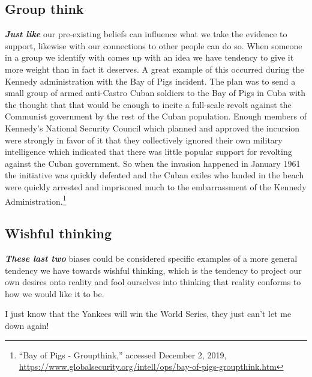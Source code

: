\documentclass[
  12pt, openany]{book}
\theoremstyle{definition}
\theoremstyle{definition}
\theoremstyle{definition}
\theoremstyle{remark}
\begin{document}
\hypertarget{group-think}{%
\subsection*{Group think}\label{group-think}}


\textbf{\emph{Just like}} our pre-existing beliefs can influence what we take the evidence to support, likewise with our connections to other people can do so. When someone in a group we identify with comes up with an idea we have tendency to give it more weight than in fact it deserves. A great example of this occurred during the Kennedy administration with the Bay of Pigs incident. The plan was to send a small group of armed anti-Castro Cuban soldiers to the Bay of Pigs in Cuba with the thought that that would be enough to incite a full-scale revolt against the Communist government by the rest of the Cuban population. Enough members of Kennedy's National Security Council which planned and approved the incursion were strongly in favor of it that they collectively ignored their own military intelligence which indicated that there was little popular support for revolting against the Cuban government. So when the invasion happened in January 1961 the initiative was quickly defeated and the Cuban exiles who landed in the beach were quickly arrested and imprisoned much to the embarrassment of the Kennedy Administration.\footnote{``Bay of Pigs - Groupthink,'' accessed December 2, 2019, \url{https://www.globalsecurity.org/intell/ops/bay-of-pigs-groupthink.htm}}

\hypertarget{wishful-thinking}{%
\subsection*{Wishful thinking}\label{wishful-thinking}}


\textbf{\emph{These last two}} biases could be considered specific examples of a more general tendency we have towards wishful thinking, which is the tendency to project our own desires onto reality and fool ourselves into thinking that reality conforms to how we would like it to be.

\begin{center}

\begin{argument}

I just know that the Yankees will win the World Series, they just can't let me down again!

\end{argument}

\end{center}
\end{document}
